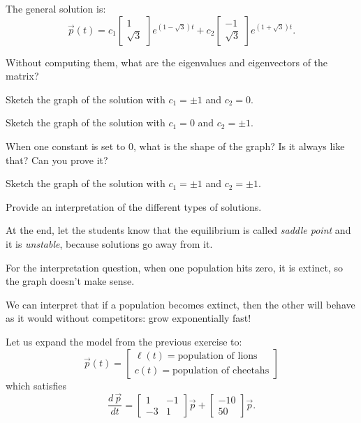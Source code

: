 	The general solution is:
	$$
	\vec{p}(t) = c_1 \begin{bmatrix} 1 \\ \sqrt{3} \end{bmatrix} e^{(1-\sqrt{3})t} + c_2 \begin{bmatrix} -1 \\ \sqrt{3} \end{bmatrix} e^{(1+\sqrt{3})t}.
	$$
\begin{parts}
	\item Without computing them, what are the eigenvalues and eigenvectors of the matrix?
	\item Sketch the graph of the solution with $c_1=\pm 1$ and $c_2=0$.
	\item Sketch the graph of the solution with $c_1=0$ and $c_2=\pm 1$.
	\item When one constant is set to 0, what is the shape of the graph? Is it always like that? Can you prove it?
	\item Sketch the graph of the solution with $c_1=\pm 1$ and $c_2=\pm 1$.
	\item Provide an interpretation of the different types of solutions.
\end{parts}

\begin{annotation}
	\begin{goals}
	At the end, let the students know that the equilibrium is called \emph{saddle point} and it is \emph{unstable}, because solutions go away from it.
	
	For the interpretation question, when one population hits zero, it is extinct, so the graph doesn't make sense. 
	
	We can interpret that if a population becomes extinct, then the other will behave as it would without competitors: grow exponentially fast!
	\end{goals}
\end{annotation}






\bookonlynewpage

\question
	Let us expand the model from the previous exercise to:
	$$ \vec{p}(t) = \begin{bmatrix} \ell(t) = \text{population of lions} \\ c(t) = \text{population of cheetahs} \end{bmatrix} $$
	which satisfies
	$$
	\frac{d\,\vec{p}}{dt} = \begin{bmatrix}
 		1 & -1 \\
 		-3 & 1
 	\end{bmatrix} \vec{p}
 	+ \begin{bmatrix}
 		- 10 \\ 50
	 \end{bmatrix} \vec{p}.
	$$
	
